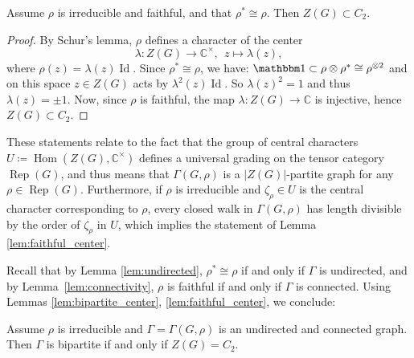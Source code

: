 \documentclass[ALCO]{cedram}
\newcommand{\Hom}{\operatorname{Hom}}
\newcommand{\Rep}{\operatorname{Rep}}
\newcommand{\triv}{{\mathbbm 1}}
\newcommand{\id}{\operatorname{Id}}
\newcommand{\C}{{\mathbb C}}
\newcommand{\abs}[1]{\left|{#1}\right|}
\newcommand{\Hom}{\operatorname{Hom}}
\begin{document}
\begin{lemma}\label{lem:faithful_center}
 Assume $\rho$ is irreducible and faithful, and that $\rho^* \cong \rho$. Then $Z(G) \subset C_2 $.
\end{lemma}

\begin{proof}
  By Schur's lemma, $\rho$ defines a character of the center $$\lambda:Z(G) \to \C^{\times}, \;\, z\mapsto \lambda(z),$$ where $\rho(z) = \lambda(z)\id$. Since $\rho^* \cong \rho$, we have: $\triv \subset \rho \otimes \rho^* \cong \rho^{\otimes 2}$ and on this space $z \in Z(G)$ acts by $\lambda^2(z)\id$. So $\lambda(z)^2 = 1$ and thus $\lambda(z)=\pm 1$. Now, since $\rho$ is faithful, the map $\lambda: Z(G) \to \C$ is injective, hence $Z(G) \subset C_2 $.
\end{proof}

\begin{rema}
 {These statements relate to the fact that the group of central characters $U\coloneqq \Hom(Z(G), \C^{\times})$ defines a universal grading on the tensor category $\Rep(G)$, and thus means that $\Gamma(G, \rho)$ is a $\abs{Z(G)}$-partite graph for any $\rho \in \Rep(G)$. Furthermore, if $\rho$ is irreducible and $\zeta_{\rho} \in U$ is the central character corresponding to $\rho$, every closed walk in $\Gamma(G, \rho)$ has length divisible by the order of $\zeta_{\rho}$ in $U$, which implies the statement of Lemma \ref{lem:faithful_center}.}
\end{rema}

Recall that by Lemma \ref{lem:undirected}, $\rho^* \cong \rho$ if and only if $\Gamma$ is undirected, and by Lemma~\ref{lem:connectivity}, $\rho$ is faithful if and only if $\Gamma$ is connected. Using Lemmas \ref{lem:bipartite_center}, \ref{lem:faithful_center}, we conclude:

\begin{coro}\label{cor:bipartite_center_Z_2}
 Assume $\rho$ is irreducible and $\Gamma = \Gamma(G, \rho)$ is an undirected and connected graph. Then $\Gamma$ is bipartite if and only if $Z(G) = C_2 $.
\end{coro}
\end{document}
